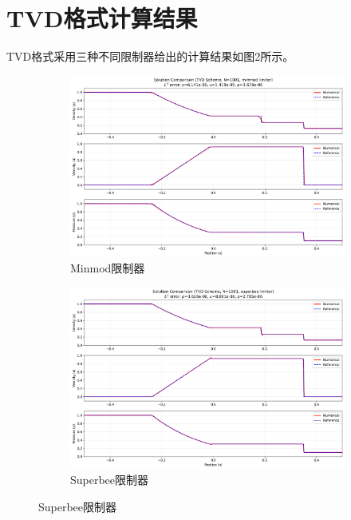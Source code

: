 \documentclass[12pt, a4paper]{article}
\begin{document}
\section{TVD格式计算结果}
TVD格式采用三种不同限制器给出的计算结果如图2所示。
\begin{figure}[htbp]
    \centering
    \begin{subfigure}[b]{0.45\textwidth} 
        \centering
        \includegraphics[width=\textwidth]{./pictures/Solution Comparison (TVD Scheme, N=1001, minmod limiter).png} 
        \caption{Minmod限制器}
    \end{subfigure}
    \hfill
    \begin{subfigure}[b]{0.45\textwidth} 
        \centering
        \includegraphics[width=\textwidth]{./pictures/Solution Comparison (TVD Scheme, N=1001, superbee limiter).png} 
        \caption{Superbee限制器}
    \end{subfigure}

\end{figure}
\end{document}
